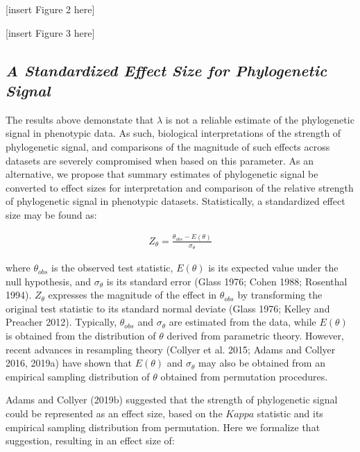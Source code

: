 \documentclass[
]{article}
\begin{document}
{[}insert Figure 2 here{]} \hfill\break

{[}insert Figure 3 here{]} \hfill\break 

\hypertarget{a-standardized-effect-size-for-phylogenetic-signal}{%
\subsection{\texorpdfstring{\emph{A Standardized Effect Size for
Phylogenetic
Signal}}{A Standardized Effect Size for Phylogenetic Signal}}\label{a-standardized-effect-size-for-phylogenetic-signal}}

The results above demonstate that \(\lambda\) is not a reliable estimate
of the phylogenetic signal in phenotypic data. As such, biological
interpretations of the strength of phylogenetic signal, and comparisons
of the magnitude of such effects across datasets are severely
compromised when based on this parameter. As an alternative, we propose
that summary estimates of phylogenetic signal be converted to effect
sizes for interpretation and comparison of the relative strength of
phylogenetic signal in phenotypic datasets. Statistically, a
standardized effect size may be found as:

\begin{align}
    Z_{\theta}=\frac{\theta_{obs}-E(\theta)}{\sigma_\theta}
\end{align}

where \(\theta_{obs}\) is the observed test statistic, \(E(\theta)\) is
its expected value under the null hypothesis, and \(\sigma_\theta\) is
its standard error (Glass 1976; Cohen 1988; Rosenthal 1994).
\(Z_{\theta}\) expresses the magnitude of the effect in \(\theta_{obs}\)
by transforming the original test statistic to its standard normal
deviate (Glass 1976; Kelley and Preacher 2012). Typically,
\(\theta_{obs}\) and \(\sigma_\theta\) are estimated from the data,
while \(E(\theta)\) is obtained from the distribution of \(\theta\)
derived from parametric theory. However, recent advances in resampling
theory (Collyer et al. 2015; Adams and Collyer 2016, 2019a) have shown
that \(E(\theta)\) and \(\sigma_\theta\) may also be obtained from an
empirical sampling distribution of \(\theta\) obtained from permutation
procedures. \hfill\break

Adams and Collyer (2019b) suggested that the strength of phylogenetic
signal could be represented as an effect size, based on the \(Kappa\)
statistic and its empirical sampling distribution from permutation. Here
we formalize that suggestion, resulting in an effect size of:
\end{document}
